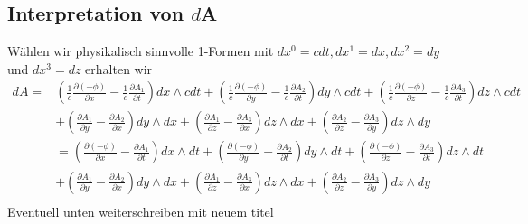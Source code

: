 \subsection{Interpretation von $d$A}
Wählen wir physikalisch sinnvolle 1-Formen mit $dx^0 = cdt,dx^1 = dx,dx^2 = dy$ und $dx^3 = dz$ erhalten wir
\begin{align*}
	dA = 
	& \left(\frac{1}{c}\frac{\partial (-\phi)}{\partial x}-\frac{1}{c}\frac{\partial A_1}{\partial t}\right) dx \wedge cdt +
	\left(\frac{1}{c}\frac{\partial (-\phi)}{\partial y}-\frac{1}{c}\frac{\partial A_2}{\partial t}\right) dy \wedge cdt +
	\left(\frac{1}{c}\frac{\partial (-\phi)}{\partial z}-\frac{1}{c}\frac{\partial A_3}{\partial t}\right) dz \wedge cdt\\
	& + \left(\frac{\partial A_1}{\partial y}-\frac{\partial A_2}{\partial x}\right) dy \wedge dx +
	\left(\frac{\partial A_1}{\partial z}-\frac{\partial A_3}{\partial x}\right) dz \wedge dx +
	\left(\frac{\partial A_2}{\partial z}-\frac{\partial A_3}{\partial y}\right) dz \wedge dy\\[2ex]
	& = \left(\frac{\partial (-\phi)}{\partial x}-\frac{\partial A_1}{\partial t}\right) dx \wedge dt +
	\left(\frac{\partial (-\phi)}{\partial y}-\frac{\partial A_2}{\partial t}\right) dy \wedge dt +
	\left(\frac{\partial (-\phi)}{\partial z}-\frac{\partial A_3}{\partial t}\right) dz \wedge dt\\
	& + \left(\frac{\partial A_1}{\partial y}-\frac{\partial A_2}{\partial x}\right) dy \wedge dx +
	\left(\frac{\partial A_1}{\partial z}-\frac{\partial A_3}{\partial x}\right) dz \wedge dx +
	\left(\frac{\partial A_2}{\partial z}-\frac{\partial A_3}{\partial y}\right) dz \wedge dy\\
\end{align*}
Eventuell unten weiterschreiben mit neuem titel

